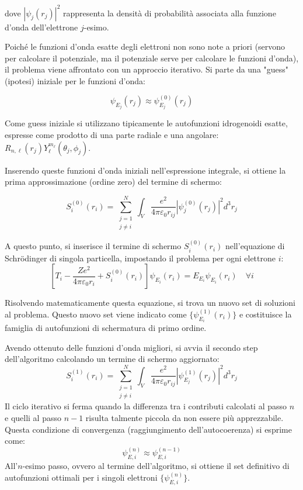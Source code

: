 dove \( |\psi_j(r_j)|^2 \) rappresenta la densità di probabilità associata alla funzione d'onda dell'elettrone \( j \)-esimo.

Poiché le funzioni d'onda esatte degli elettroni non sono note a priori (servono per calcolare il potenziale, ma il potenziale serve per calcolare le funzioni d'onda), il problema viene affrontato con un approccio iterativo. Si parte da una "guess" (ipotesi) iniziale per le funzioni d'onda:

\begin{equation}
    \psi_{E_j}(r_j) \approx \psi_{E_j}^{(0)}(r_j)
\end{equation}

Come guess iniziale si utilizzano tipicamente le autofunzioni idrogenoidi esatte, espresse come prodotto di una parte radiale e una angolare: \( R_{n,\ell}(r_j)Y_\ell^{m_\ell}(\theta_j, \phi_j) \).

Inserendo queste funzioni d'onda iniziali nell'espressione integrale, si ottiene la prima approssimazione (ordine zero) del termine di schermo:

\begin{equation}
    S_i^{(0)}(r_i) = \sum_{\substack{j=1 \\ j \neq i}}^{N} \int_V \frac{e^2}{4\pi\varepsilon_0 r_{ij}} |\psi_j^{(0)}(r_j)|^2 d^3 r_j
\end{equation}

A questo punto, si inserisce il termine di schermo \( S_i^{(0)}(r_i) \) nell'equazione di Schrödinger di singola particella, impostando il problema per ogni elettrone \( i \):
\begin{equation}
    \left[ T_i - \frac{Ze^2}{4\pi\varepsilon_0 r_i} + S_i^{(0)}(r_i) \right] \psi_{E_i}(r_i) = E_{E_i} \psi_{E_i}(r_i) \quad \forall i
\end{equation}

Risolvendo matematicamente questa equazione, si trova un nuovo set di soluzioni al problema. Questo nuovo set viene indicato come \( \{ \psi_{E_i}^{(1)}(r_i) \} \) e costituisce la famiglia di autofunzioni di schermatura di primo ordine.

Avendo ottenuto delle funzioni d'onda migliori, si avvia il secondo step dell'algoritmo calcolando un termine di schermo aggiornato:
\begin{equation}
    S_i^{(1)}(r_i) = \sum_{\substack{j=1 \\ j \neq i}}^{N} \int_V \frac{e^2}{4\pi\varepsilon_0 r_{ij}} |\psi_{E_j}^{(1)}(r_j)|^2 d^3 r_j
\end{equation}
Il ciclo iterativo si ferma quando la differenza tra i contributi calcolati al passo \( n \) e quelli al passo \( n-1 \) risulta talmente piccola da non essere più apprezzabile. Questa condizione di convergenza (raggiungimento dell'autocoerenza) si esprime come:
\begin{equation}
    \psi_{E,i}^{(n)} \approx \psi_{E,i}^{(n-1)}
\end{equation}
All'\( n \)-esimo passo, ovvero al termine dell'algoritmo, si ottiene il set definitivo di autofunzioni ottimali per i singoli elettroni \( \{ \psi_{E,i}^{(n)} \} \). 

